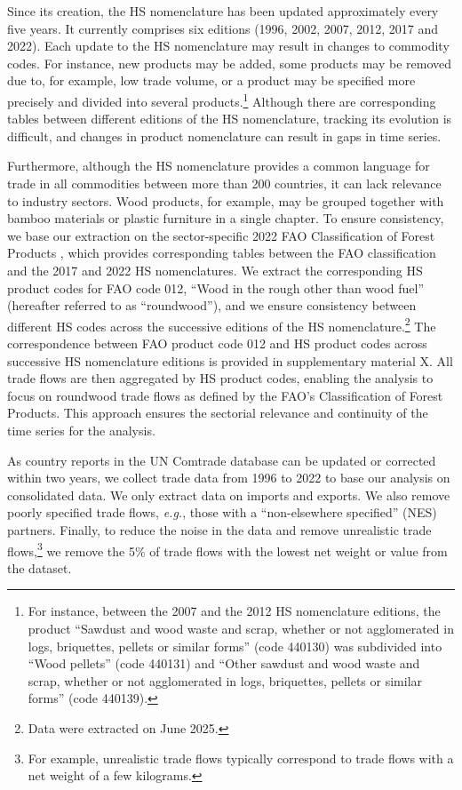 \documentclass[
  authoryear,
  review,
  3p]{elsarticle}
\begin{document}
Since its creation, the HS nomenclature has been updated approximately
every five years. It currently comprises six editions (1996, 2002, 2007,
2012, 2017 and 2022). Each update to the HS nomenclature may result in
changes to commodity codes. For instance, new products may be added,
some products may be removed due to, for example, low trade volume, or a
product may be specified more precisely and divided into several
products.\footnote{For instance, between the 2007 and the 2012 HS
  nomenclature editions, the product ``Sawdust and wood waste and scrap,
  whether or not agglomerated in logs, briquettes, pellets or similar
  forms'' (code 440130) was subdivided into ``Wood pellets'' (code
  440131) and ``Other sawdust and wood waste and scrap, whether or not
  agglomerated in logs, briquettes, pellets or similar forms'' (code
  440139).} Although there are corresponding tables between different
editions of the HS nomenclature, tracking its evolution is difficult,
and changes in product nomenclature can result in gaps in time series.

Furthermore, although the HS nomenclature provides a common language for
trade in all commodities between more than 200 countries, it can lack
relevance to industry sectors. Wood products, for example, may be
grouped together with bamboo materials or plastic furniture in a single
chapter. To ensure consistency, we base our extraction on the
sector-specific 2022 FAO Classification of Forest Products
\citep{fao_classification_2022}, which provides corresponding tables
between the FAO classification and the 2017 and 2022 HS nomenclatures.
We extract the corresponding HS product codes for FAO code 012, ``Wood
in the rough other than wood fuel'' (hereafter referred to as
``roundwood''), and we ensure consistency between different HS codes
across the successive editions of the HS nomenclature.\footnote{Data
  were extracted on June 2025.} The correspondence between FAO product
code 012 and HS product codes across successive HS nomenclature editions
is provided in supplementary material X. All trade flows are then
aggregated by HS product codes, enabling the analysis to focus on
roundwood trade flows as defined by the FAO's Classification of Forest
Products. This approach ensures the sectorial relevance and continuity
of the time series for the analysis.

As country reports in the UN Comtrade database can be updated or
corrected within two years, we collect trade data from 1996 to 2022 to
base our analysis on consolidated data. We only extract data on imports
and exports. We also remove poorly specified trade flows, \emph{e.g.},
those with a ``non-elsewhere specified'' (NES) partners. Finally, to
reduce the noise in the data and remove unrealistic trade
flows,\footnote{For example, unrealistic trade flows typically
  correspond to trade flows with a net weight of a few kilograms.} we
remove the 5\% of trade flows with the lowest net weight or value from
the dataset.
\end{document}
